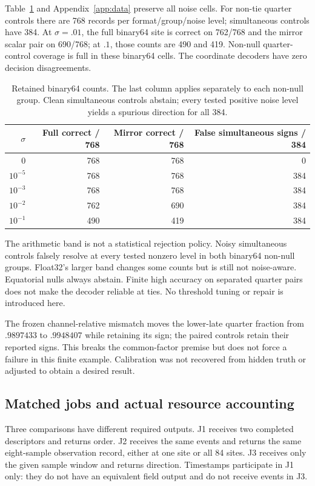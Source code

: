 Table~\ref{tab:noiseanchor} and Appendix~\ref{app:data} preserve all noise cells. For non-tie quarter controls there are 768 records per format/group/noise level; simultaneous controls have 384. At $\sigma=.01$, the full binary64 site is correct on 762/768 and the mirror scalar pair on 690/768; at $.1$, those counts are 490 and 419. Non-null quarter-control coverage is full in these binary64 cells. The coordinate decoders have zero decision disagreements.

\begin{table}[ht]\centering
\begin{tabular}{rrrr}\toprule
$\sigma$ & Full correct / 768 & Mirror correct / 768 & False simultaneous signs / 384\\\midrule
0 & 768 & 768 & 0\\
$10^{-5}$ & 768 & 768 & 384\\
$10^{-3}$ & 768 & 768 & 384\\
$10^{-2}$ & 762 & 690 & 384\\
$10^{-1}$ & 490 & 419 & 384\\\bottomrule
\end{tabular}
\caption{Retained binary64 counts. The last column applies separately to each non-null group. Clean simultaneous controls abstain; every tested positive noise level yields a spurious direction for all 384.}
\label{tab:noiseanchor}
\end{table}
The arithmetic band is not a statistical rejection policy. Noisy simultaneous controls falsely resolve at every tested nonzero level in both binary64 non-null groups. Float32's larger band changes some counts but is still not noise-aware. Equatorial nulls always abstain. Finite high accuracy on separated quarter pairs does not make the decoder reliable at ties. No threshold tuning or repair is introduced here.

The frozen channel-relative mismatch moves the lower-late quarter fraction from $.9897433$ to $.9948407$ while retaining its sign; the paired controls retain their reported signs. This breaks the common-factor premise but does not force a failure in this finite example. Calibration was not recovered from hidden truth or adjusted to obtain a desired result.

\subsection{Matched jobs and actual resource accounting}\label{sec:cost}
Three comparisons have different required outputs. J1 receives two completed descriptors and returns order. J2 receives the same events and returns the same eight-sample observation record, either at one site or all 84 sites. J3 receives only the given sample window and returns direction. Timestamps participate in J1 only: they do not have an equivalent field output and do not receive events in J3.

